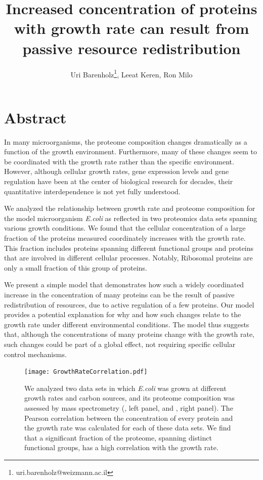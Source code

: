 \documentclass[a4paper,landscape,17pt]{extarticle}
\title{\Huge Increased concentration of proteins with growth rate can result from passive resource redistribution}
\author{\Large Uri Barenholz\thanks{uri.barenholz@weizmann.ac.il}, Leeat Keren, Ron Milo}
\affil{Weizmann Institute of Science, Rehovot, Israel}
\date{}
\begin{document}
\maketitle
\clearpage
\section*{\LARGE Abstract}
In many microorganisms, the proteome composition changes dramatically as a function of the growth environment.
Furthermore, many of these changes seem to be coordinated with the growth rate rather than the specific environment.
However, although cellular growth rates, gene expression levels and gene regulation have been at the center of biological research for decades, their quantitative interdependence is not yet fully understood.

We analyzed the relationship between growth rate and proteome composition for the model microorganism \emph{E.coli} as reflected in two proteomics data sets spanning various growth conditions.
We found that the cellular concentration of a large fraction of the proteins measured coordinately increases with the growth rate.
This fraction includes proteins spanning different functional groups and proteins that are involved in different cellular processes.
Notably, Ribosomal proteins are only a small fraction of this group of proteins.

We present a simple model that demonstrates how such a widely coordinated increase in the concentration of many proteins can be the result of passive redistribution of resources, due to active regulation of a few proteins.
Our model provides a potential explanation for why and how such changes relate to the growth rate under different environmental conditions.
The model thus suggests that, although the concentrations of many proteins change with the growth rate, such changes could be part of a global effect, not requiring specific cellular control mechanisms.
\clearpage        

\begin{figure}[h]
\centering
\texttt{[image: GrowthRateCorrelation.pdf]}
\caption{\linespread{0.5}\selectfont{}
  We analyzed two data sets in which \emph{E.coli} was grown at different growth rates and carbon sources, and its proteome composition was assessed by mass spectrometry (\parencite{Valgepea2013}, left panel, and \parencite{Heinemann2014}, right panel).
The Pearson correlation between the concentration of every protein and the growth rate was calculated for each of these data sets.
We find that a significant fraction of the proteome, spanning distinct functional groups, has a high correlation with the growth rate.
}
\label{fig:growthcorr}
\end{figure}
\end{document}
